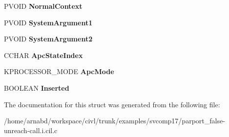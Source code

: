 \begin{DoxyCompactItemize}
\item 
\hypertarget{struct__KAPC_a07d11cc934d3247af80a1dbc7d6e5a55}{}P\+V\+O\+I\+D {\bfseries Normal\+Context}\label{struct__KAPC_a07d11cc934d3247af80a1dbc7d6e5a55}

\item 
\hypertarget{struct__KAPC_a375f784f0fbe6bcab5b6791be8ffa7e8}{}P\+V\+O\+I\+D {\bfseries System\+Argument1}\label{struct__KAPC_a375f784f0fbe6bcab5b6791be8ffa7e8}

\item 
\hypertarget{struct__KAPC_aa4fbf857c86b10f74f60f4f1845dde54}{}P\+V\+O\+I\+D {\bfseries System\+Argument2}\label{struct__KAPC_aa4fbf857c86b10f74f60f4f1845dde54}

\item 
\hypertarget{struct__KAPC_a541afd3606fea5a0f6a4a11e71117c29}{}C\+C\+H\+A\+R {\bfseries Apc\+State\+Index}\label{struct__KAPC_a541afd3606fea5a0f6a4a11e71117c29}

\item 
\hypertarget{struct__KAPC_a0f08a5eedec1c47bf7ab0bfbda515a34}{}K\+P\+R\+O\+C\+E\+S\+S\+O\+R\+\_\+\+M\+O\+D\+E {\bfseries Apc\+Mode}\label{struct__KAPC_a0f08a5eedec1c47bf7ab0bfbda515a34}

\item 
\hypertarget{struct__KAPC_a286d1660639cfd825395565f81f7c3e0}{}B\+O\+O\+L\+E\+A\+N {\bfseries Inserted}\label{struct__KAPC_a286d1660639cfd825395565f81f7c3e0}

\end{DoxyCompactItemize}


The documentation for this struct was generated from the following file\+:\begin{DoxyCompactItemize}
\item 
/home/arnabd/workspace/civl/trunk/examples/svcomp17/parport\+\_\+false-\/unreach-\/call.\+i.\+cil.\+c\end{DoxyCompactItemize}
